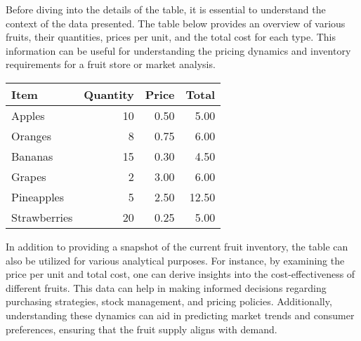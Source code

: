 \documentclass{article}
\begin{document}
Before diving into the details of the table, it is essential to understand the context of the data presented. The table below provides an overview of various fruits, their quantities, prices per unit, and the total cost for each type. This information can be useful for understanding the pricing dynamics and inventory requirements for a fruit store or market analysis.

\begin{center}
    \begin{tabular}{|l|r|r|r|}
        \hline
        Item         & Quantity & Price & Total \\
        \hline
        Apples       & 10       & 0.50  & 5.00  \\
        Oranges      & 8        & 0.75  & 6.00  \\
        Bananas      & 15       & 0.30  & 4.50  \\
        Grapes       & 2        & 3.00  & 6.00  \\
        Pineapples   & 5        & 2.50  & 12.50 \\
        Strawberries & 20       & 0.25  & 5.00  \\
        \hline
        \end{tabular}
\end{center}

In addition to providing a snapshot of the current fruit inventory, the table can also be utilized for various analytical purposes. For instance, by examining the price per unit and total cost, one can derive insights into the cost-effectiveness of different fruits. This data can help in making informed decisions regarding purchasing strategies, stock management, and pricing policies. Additionally, understanding these dynamics can aid in predicting market trends and consumer preferences, ensuring that the fruit supply aligns with demand.
\end{document}
